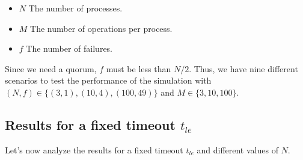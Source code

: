 \documentclass{article}
\begin{document}
\begin{itemize}
    \item $N$ The number of processes.
    \item $M$ The number of operations per process.
    \item $f$ The number of failures.
\end{itemize}

Since we need a quorum, $f$ must be less than $N/2$. Thus,
we have nine different scenarios to test the performance of the simulation
with $(N,f) \in \{(3,1),(10,4),(100,49)\}$ and $M \in \{3,10,100\}$.

\subsection{Results for a fixed timeout $t_{le}$}
Let's now analyze the results for a fixed timeout $t_{le}$ and different values of $N$.
\end{document}
